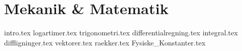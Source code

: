 \documentclass[crop=false, class=memoir]{standalone}
\begin{document}
\chapter{Mekanik \& Matematik} \label{chap:matematik}
{intro.tex}
{logartimer.tex}
{trigonometri.tex}
{differentialregning.tex}
{integral.tex}
{diffligninger.tex}
{vektorer.tex}
{raekker.tex}
\newpage
{Fysiske_Konstanter.tex}

\nocite{stewartCalculusConceptsContexts2006}
\nocite{youngSearsZemanskyUniversity2016}
\nocite{arfkenMathematicalMethodsPhysicists2013}
\nocite{taylorClassicalMechanics2005}
\end{document}
